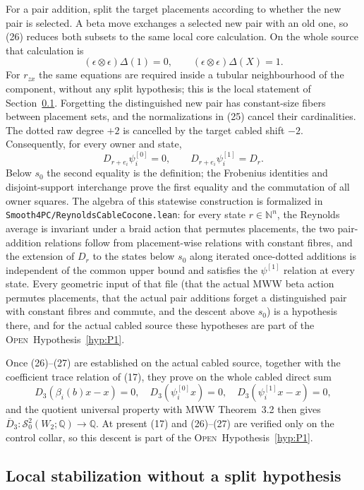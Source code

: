 \documentclass[11pt]{amsart}
\theoremstyle{definition}
\theoremstyle{remark}
\newcommand{\Q}{\mathbb{Q}}
\newcommand{\Open}{\textnormal{\textsc{Open}}}
\begin{document}
For a pair addition, split the target placements according to whether the
new pair is selected.  A beta move exchanges a selected new pair with an old
one, so (26) reduces both subsets to the same local core calculation.  On the
whole source that calculation is
\[
(\epsilon\otimes\epsilon)\Delta(1)=0,\qquad
(\epsilon\otimes\epsilon)\Delta(X)=1.
\]
For $r_{zx}$ the same equations are required inside a tubular neighbourhood
of the component, without any split hypothesis; this is the local statement
of Section~\ref{sec:local-stabilization}.  Forgetting the distinguished new pair has constant-size fibers
between placement sets, and the normalizations in (25) cancel their
cardinalities.  The dotted raw degree $+2$ is cancelled by the target cabled
shift $-2$.  Consequently, for every owner and state,
\[
D_{r+e_i}\psi_i^{[0]}=0,\qquad
D_{r+e_i}\psi_i^{[1]}=D_r.
\tag{27}
\]
Below $s_0$ the second equality is the definition; the Frobenius identities
and disjoint-support interchange prove the first equality and the commutation
of all owner squares.  The algebra of this statewise construction is
formalized in \texttt{Smooth4PC/ReynoldsCableCocone.lean}: for every state
$r\in\mathbb N^n$, the Reynolds average is invariant under a braid action
that permutes placements, the two pair-addition relations follow from
placement-wise relations with constant fibres, and the extension of $D_r$
to the states below $s_0$ along iterated once-dotted additions is
independent of the common upper bound and satisfies the $\psi^{[1]}$
relation at every state.  Every geometric input of that file (that the
actual MWW beta action permutes placements, that the actual pair additions
forget a distinguished pair with constant fibres and commute, and the
descent above $s_0$) is a hypothesis there, and for the actual cabled
source these hypotheses are part of the \Open\ Hypothesis~\ref{hyp:P1}.

Once (26)--(27) are established on the actual cabled source, together with
the coefficient trace relation of (17), they prove on the whole cabled
direct sum
\[
D_3(\beta_i(b)x-x)=0,\quad
D_3(\psi_i^{[0]}x)=0,\quad
D_3(\psi_i^{[1]}x-x)=0,
\]
and the quotient universal property with MWW Theorem~3.2 then gives
$\overline D_3:\mathcal S^2_0(W_2;\Q)\to\Q$.  At present (17) and
(26)--(27) are verified only on the control collar, so this descent is part
of the \Open\ Hypothesis~\ref{hyp:P1}.

\subsection{Local stabilization without a split hypothesis}
\label{sec:local-stabilization}
\end{document}
